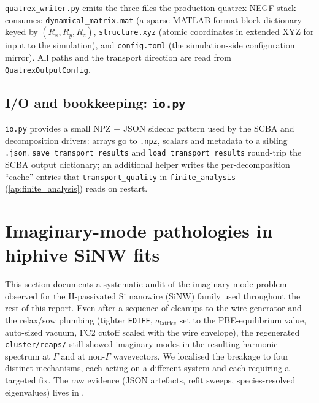 \texttt{quatrex\_writer.py} emits the three files the production
quatrex NEGF stack consumes: \texttt{dynamical\_matrix.mat} (a sparse
MATLAB-format block dictionary keyed by $(R_x, R_y, R_z)$,
\texttt{structure.xyz} (atomic coordinates in extended XYZ for input
to the simulation), and \texttt{config.toml} (the simulation-side
configuration mirror).  All paths and the transport direction are read
from \texttt{QuatrexOutputConfig}.

\subsection{I/O and bookkeeping: \texttt{io.py}}
\label{sec:io_helpers}

\texttt{io.py} provides a small NPZ + JSON sidecar pattern used by the
SCBA and decomposition drivers: arrays go to \texttt{.npz}, scalars and
metadata to a sibling \texttt{.json}.  \texttt{save\_transport\_results}
and \texttt{load\_transport\_results} round-trip the SCBA output
dictionary; an additional helper writes the per-decomposition
``cache'' entries that \texttt{transport\_quality} in
\texttt{finite\_analysis} (\cref{ap:finite_analysis}) reads on
restart.


\section{Imaginary-mode pathologies in hiphive SiNW fits}
\label{sec:hiphive_pathologies}

This section documents a systematic audit of the imaginary-mode
problem observed for the H-passivated Si nanowire (SiNW) family used
throughout the rest of this report.  Even
after a sequence of cleanups to the wire generator and the relax/sow
plumbing (tighter \texttt{EDIFF}, $a_\mathrm{lattice}$ set to the
PBE-equilibrium value, auto-sized vacuum, FC2 cutoff scaled with the
wire envelope), the regenerated \texttt{cluster/reaps/} still showed
imaginary modes in the resulting harmonic spectrum at $\Gamma$ and at
non-$\Gamma$ wave\-vectors.  We localised the breakage to four distinct
mechanisms, each acting on a different system and each requiring a
targeted fix.  The raw evidence (JSON artefacts, refit sweeps,
species-resolved eigenvalues) lives in
.

